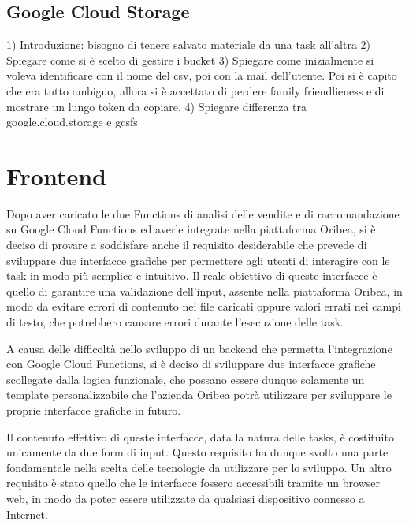 \subsection{Google Cloud Storage}

1) Introduzione: bisogno di tenere salvato materiale da una task all'altra
2) Spiegare come si è scelto di gestire i bucket
3) Spiegare come inizialmente si voleva identificare con il nome del csv, poi con la mail dell'utente. Poi si è capito che era tutto ambiguo, allora si è accettato di perdere family friendlieness e di mostrare un lungo token da copiare.
4) Spiegare differenza tra google.cloud.storage e gcsfs


\section{Frontend}
\label{sec:frontend}

Dopo aver caricato le due Functions di analisi delle vendite e di raccomandazione su Google Cloud Functions ed averle integrate nella piattaforma Oribea, si è deciso di provare a soddisfare anche il requisito desiderabile che prevede di sviluppare due interfacce grafiche per permettere agli utenti di interagire con le task in modo più semplice e intuitivo. Il reale obiettivo di queste interfacce è quello di garantire una validazione dell'input, assente nella piattaforma Oribea, in modo da evitare errori di contenuto nei file caricati oppure valori errati nei campi di testo, che potrebbero causare errori durante l'esecuzione delle task.

A causa delle difficoltà nello sviluppo di un backend che permetta l'integrazione con Google Cloud Functions, si è deciso di sviluppare due interfacce grafiche scollegate dalla logica funzionale, che possano essere dunque solamente un template personalizzabile che l'azienda Oribea potrà utilizzare per sviluppare le proprie interfacce grafiche in futuro.

Il contenuto effettivo di queste interfacce, data la natura delle tasks, è costituito unicamente da due form di input. Questo requisito ha dunque svolto una parte fondamentale nella scelta delle tecnologie da utilizzare per lo sviluppo.
Un altro requisito è stato quello che le interfacce fossero accessibili tramite un browser web, in modo da poter essere utilizzate da qualsiasi dispositivo connesso a Internet.

